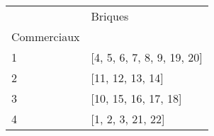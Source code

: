 \documentclass[preview]{standalone}
\begin{document}
    \begin{tabular}{ll}
\toprule
 & Briques \\
Commerciaux &  \\
\midrule
1 & [4, 5, 6, 7, 8, 9, 19, 20] \\
2 & [11, 12, 13, 14] \\
3 & [10, 15, 16, 17, 18] \\
4 & [1, 2, 3, 21, 22] \\
\bottomrule
\end{tabular}

    
\end{document}
